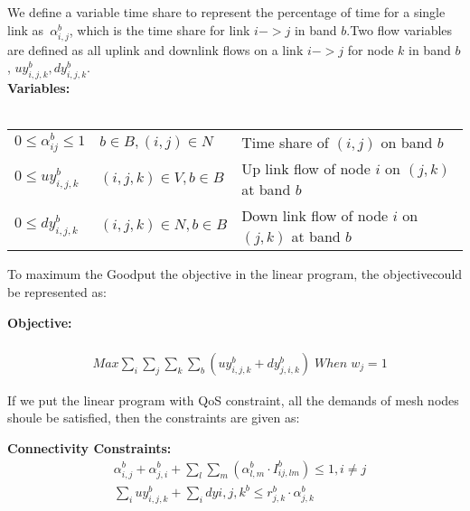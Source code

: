 We define a variable time share to represent the percentage of time for a single link as~\emph{$\alpha_{i,j}^b$},
which is the time share for link $i->j$ in band $b$.Two flow variables are defined as all uplink and downlink flows 
on a link $i->j$ for node $k$ in band $b$, $uy_{i,j,k}^b,dy_{i,j,k}^b$.
\\
{\bf Variables:}\\
\\
\begin{tabular}{llp{3cm}}
$0\le \alpha_{ij}^b \le 1$  & $b\in B, (i,j) \in N$ & 
Time share of $(i,j)$ on band $b$\\ 
$0\le uy_{i,j,k}^b$ & $(i,j,k) \in V, b \in B$ & 
Up link flow of node $i$ on $(j,k)$ at band $b$ \\ 
$0\le dy_{i,j,k}^b$ & $(i,j,k) \in N, b \in B$ & 
Down link flow of node $i$ on $(j,k)$ at band $b$ \\ 
\end{tabular}

To maximum the Goodput the objective in the linear program, the objectivecould be represented as:

\noindent
{\bf Objective:}\\
\\
\begin{align}
& Max \sum_i\sum_j\sum_k\sum_b(uy_{i,j,k}^b+dy_{j,i,k}^b) \; When \; w_j=1
\end{align}

If we put the linear program with QoS constraint, all the demands of mesh nodes shoule be satisfied, then the constraints are given as:

\noindent
{\bf Connectivity Constraints:}
\begin{align}
\label{opt:1}
& \alpha_{i,j}^b + \alpha_{j,i}^b + \sum_l\sum_m(\alpha_{l,m}^b \cdot I_{ij,lm}^b) \leq 1, i\neq j \\
\label{opt:2}
& \sum_i uy_{i,j,k}^b + \sum_i dy{i,j,k}^b \leq r_{j,k}^b \cdot \alpha_{j,k}^b \\
\end{align}

